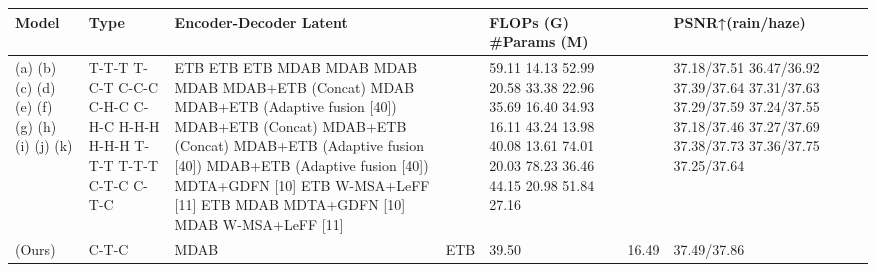 \begin{tabular}{lllllll}
\toprule
Model & Type & Encoder-Decoder Latent &  & FLOPs (G) \#Params (M) &  & PSNR↑(rain/haze) \\
\midrule
(a) (b) (c) (d) (e) (f) (g) (h) (i) (j) (k) & T-T-T T-C-T C-C-C C-H-C C-H-C H-H-H H-H-H T-T-T T-T-T C-T-C C-T-C & ETB ETB ETB MDAB MDAB MDAB MDAB MDAB+ETB (Concat) MDAB MDAB+ETB (Adaptive fusion [40]) MDAB+ETB (Concat) MDAB+ETB (Concat) MDAB+ETB (Adaptive fusion [40]) MDAB+ETB (Adaptive fusion [40]) MDTA+GDFN [10] ETB W-MSA+LeFF [11] ETB MDAB MDTA+GDFN [10] MDAB W-MSA+LeFF [11] &  & 59.11 14.13 52.99 20.58 33.38 22.96 35.69 16.40 34.93 16.11 43.24 13.98 40.08 13.61 74.01 20.03 78.23 36.46 44.15 20.98 51.84 27.16 &  & 37.18/37.51 36.47/36.92 37.39/37.64 37.31/37.63 37.29/37.59 37.24/37.55 37.18/37.46 37.27/37.69 37.38/37.73 37.36/37.75 37.25/37.64 \\
(Ours) & C-T-C & MDAB & ETB & 39.50 & 16.49 & 37.49/37.86 \\
\bottomrule
\end{tabular}
